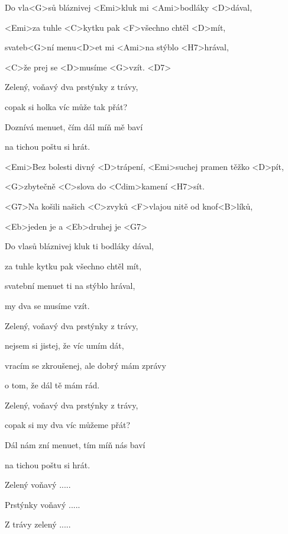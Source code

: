

\zs
Do vla<G>sů bláznivej <Emi>kluk mi <Ami>bodláky <D>dával, 

<Emi>za tuhle <C>kytku pak <F>všechno chtěl <D>mít,

svateb<G>ní menu<D>et mi <Ami>na stýblo <H7>hrával, 

<C>že prej se <D>musíme <G>vzít. <D7>
\ks

\zs
Zelený, voňavý dva prstýnky z trávy,

copak si holka víc může tak přát?

Doznívá menuet, čím dál míň mě baví

na tichou poštu si hrát.
\ks

\zr
<Emi>Bez bolesti divný <D>trápení, <Emi>suchej pramen těžko <D>pít,

<G>zbytečně <C>slova do <Cdim>kamení <H7>sít.

<G7>Na košili našich <C>zvyků <F>vlajou nitě od 
knof<B>líků,

<Eb>jeden je  a <Eb>druhej je  <G7>
\kr

\zs
Do vlasů bláznivej kluk ti bodláky dával,

za tuhle kytku pak všechno chtěl mít,

svatební menuet ti na stýblo hrával,

my dva se musíme vzít.
\ks

\zs
Zelený, voňavý dva prstýnky z trávy,

nejsem si jistej, že víc umím dát,

vracím se zkroušenej, ale dobrý mám zprávy

o tom, že dál tě mám rád.
\ks

\zs
Zelený, voňavý dva prstýnky z trávy,

copak si my dva víc můžeme přát?

Dál nám zní menuet, tím míň nás baví

na tichou poštu si hrát.



Zelený voňavý .....

Prstýnky voňavý .....

Z trávy zelený ..... 
\ks
\kp
